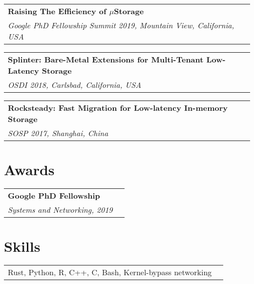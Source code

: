 \documentclass[margin,line]{res}
\begin{document}
\begin{resume}
\begin{tabular}{@{}p{5.5in}p{4in}}
{\bf Raising The Efficiency of $\mu$Storage}\\
{\small\em Google PhD Fellowship Summit 2019, Mountain View, California,
USA}\\
\end{tabular}

\vspace{-2.5pt}
\begin{tabular}{@{}p{5.5in}p{4in}}
{\bf Splinter: Bare-Metal Extensions for Multi-Tenant Low-Latency Storage}\\
{\small\em OSDI 2018, Carlsbad, California, USA}\\
\end{tabular}

\vspace{-2.5pt}
\begin{tabular}{@{}p{5.5in}p{4in}}
{\bf Rocksteady: Fast Migration for Low-latency In-memory Storage}\\
{\small\em SOSP 2017, Shanghai, China}\\
\end{tabular}

\section{\sc Awards}
\begin{tabular}{@{}p{5.5in}p{4in}}
{\bf Google PhD Fellowship}\\
{\small\em Systems and Networking, 2019}\\
\end{tabular}

\section{\sc Skills}
\begin{tabular}{@{}p{5.5in}p{4in}}
Rust, Python, R, C++, C, Bash, Kernel-bypass networking
\end{tabular}

\end{resume}
\end{document}
